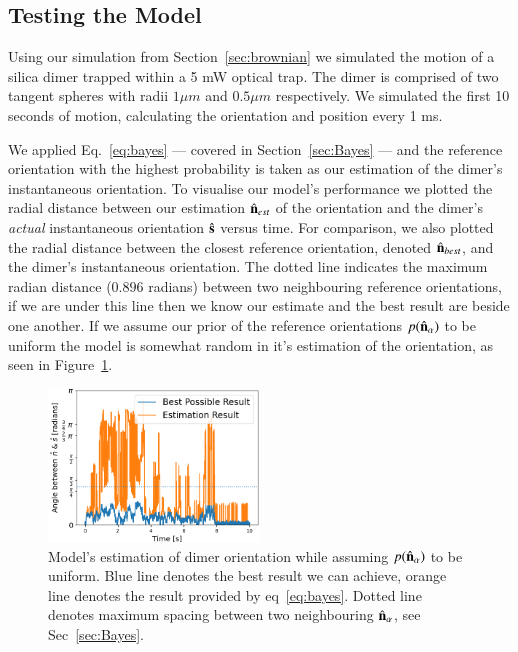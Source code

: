 \documentclass[final,  3p]{elsarticle}
\begin{document}
\subsection{Testing the Model}
\label{sec:test}

Using our simulation from Section~\ref{sec:brownian} we simulated the motion of a silica dimer trapped within a 5 mW optical trap. The dimer is comprised of two tangent spheres with radii $1 \mu m$ and $0.5 \mu m$ respectively. We simulated the first 10 seconds of motion, calculating the orientation and position every 1 ms. 

We applied Eq.~\eqref{eq:bayes} --- covered in Section~\ref{sec:Bayes} --- and the reference orientation with the highest probability is taken as our estimation of the dimer's instantaneous orientation. To visualise our model's performance  we plotted the radial distance between our estimation $\hat{\bf n}_{est}$ of the orientation and the dimer's \emph{actual} instantaneous orientation $\hat{\bf s}$ versus time. For comparison, we also plotted the radial distance between the closest reference orientation, denoted $\hat{\bf n}_{best}$, and the dimer's instantaneous orientation. The dotted line indicates the maximum radian distance ($0.896$ radians) between two neighbouring reference orientations, if we are under this line then we know our estimate and the best result are beside one another. If we assume our prior of the reference orientations $p(\hat{\bf n}_\alpha)$ to be uniform the model is somewhat random in it's estimation of the orientation, as seen in Figure~\ref{fig:uniform}.

\begin{figure}[h]
	\centering
	\includegraphics[width=0.5\textwidth]{./Images/fig3.png}
	\caption{Model's estimation of dimer orientation while assuming $p(\hat{\bf n}_\alpha)$ to be uniform. Blue line denotes the best result we can achieve, orange line denotes the result provided by eq~\ref{eq:bayes}. Dotted line denotes maximum spacing between two neighbouring $\hat{\bf n}_\alpha$, see Sec~\ref{sec:Bayes}.}
	\label{fig:uniform}
\end{figure} 
\end{document}
